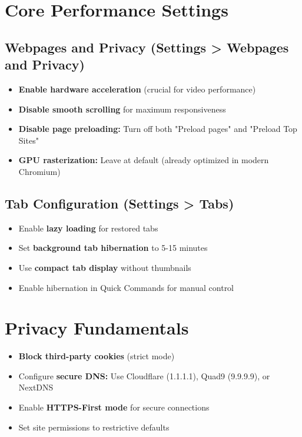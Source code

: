 \documentclass[11pt,a4paper,oneside]{book}
\newcommand{\menupath}[1]{\textbf{\color{darkgray}#1}}
\begin{document}
\section{Core Performance Settings}

\subsection{Webpages and Privacy (\menupath{Settings > Webpages and Privacy})}

\begin{itemize}
    \item \textbf{Enable hardware acceleration} (crucial for video performance)
    \item \textbf{Disable smooth scrolling} for maximum responsiveness
    \item \textbf{Disable page preloading:} Turn off both "Preload pages" and "Preload Top Sites"
    \item \textbf{GPU rasterization:} Leave at default (already optimized in modern Chromium)
\end{itemize}

\subsection{Tab Configuration (\menupath{Settings > Tabs})}

\begin{itemize}
    \item Enable \textbf{lazy loading} for restored tabs
    \item Set \textbf{background tab hibernation} to 5-15 minutes
    \item Use \textbf{compact tab display} without thumbnails
    \item Enable hibernation in Quick Commands for manual control
\end{itemize}

\section{Privacy Fundamentals}

\begin{itemize}
    \item \textbf{Block third-party cookies} (strict mode)
    \item Configure \textbf{secure DNS:} Use Cloudflare (1.1.1.1), Quad9 (9.9.9.9), or NextDNS
    \item Enable \textbf{HTTPS-First mode} for secure connections
    \item Set site permissions to restrictive defaults
\end{itemize}
\end{document}
